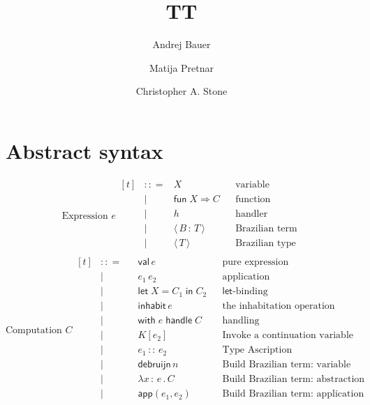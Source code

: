 \documentclass{article}
\newcommand{\bnf}{\mathrel{{:}{:}{=}}}
\newcommand{\bnfor}{|}
\newcommand{\x}{x}     %
\newcommand{\C}{C}     %
\newcommand{\K}{K}     %
\newcommand{\X}{X}     %
\newcommand{\e}{e}     %
\newcommand{\rgn}{r}   %
\newcommand{\T}{T}     %
\newcommand{\B}{B}     %
\newcommand{\val}{\mathsf{val}\,} %
\newcommand{\letin}[1]{\mathsf{let}\; #1 \;\mathsf{in}\;} %
\newcommand{\inhabitOp}[1]{\mathsf{inhabit}\,#1} %
\newcommand{\withhandle}[1]{\mathsf{with}\;#1\;\mathsf{handle}\;} %
\newcommand{\abs}[1]{\mathsf{abs}\;#1\;\mathsf{in}\;} %
\newcommand{\new}[2]{\mathsf{new}(#1,#2)} %
\newcommand{\fun}[1]{\mathsf{fun}\;#1\Rightarrow} %
\newcommand{\app}[2]{#1\,#2} %
\newcommand{\lam}[2]{\lambda #1 \,{:}\, #2 \,.\,} %
\newcommand{\kapp}[2]{#1[#2]} %
\newcommand{\bterm}[2]{\langle\,#1\, :\, #2\,\rangle} %
\newcommand{\bty}[1]{\langle\,#1\,\rangle} %
\newcommand{\makeApp}[2]{\mathsf{app}(#1,#2)} %
\newcommand{\debruijn}[1]{\mathsf{debruijn}\,#1} %
\newcommand{\ascribe}[2]{#1 \,{:}{:}\, #2} %
\begin{document}
\title{TT}
\author{Andrej Bauer \and Matija Pretnar \and Christopher A. Stone}
\maketitle

\section{Abstract syntax}
\label{sec:abstract-syntax}

\begin{equation*}
  \text{Expression $\e$}
  \begin{aligned}[t]
    &\bnf   {} & \X          && \text{variable} \\
    &\bnfor {} & \fun{\X} \C  && \text{function} \\
    &\bnfor {} & h           && \text{handler} \\
    &\bnfor {} & \bterm{\B}{\T}           && \text{Brazilian term} \\
    &\bnfor {} & \bty{\T}           && \text{Brazilian type} \\
  \end{aligned}
\end{equation*}
%
\begin{equation*}
  \text{Computation $\C$}
  \begin{aligned}[t]
    &\bnf   {} && \val \e                && \text{pure expression} \\
    &\bnfor {} && \app{\e_1}{\e_2}   && \text{application} \\
    &\bnfor {} && \letin{\X = \C_1} \C_2  && \text{$\mathsf{let}$-binding} \\
    &\bnfor {} && \inhabitOp{\e} && \text{the inhabitation operation} \\
    &\bnfor {} && \withhandle{\e} \C && \text{handling} \\
    &\bnfor {} && \kapp{\K}{\e_2}   && \text{Invoke a continuation variable} \\
    &\bnfor {} && \ascribe{\e_1}{\e_2} && \text{Type Ascription} \\
    &\bnfor {} && \debruijn{n} && \text{Build Brazilian term: variable} \\
    &\bnfor {} && \lam{\x}{\e} \C   && \text{Build Brazilian term: abstraction} \\
    &\bnfor {} && \makeApp{\e_1}{\e_2} && \text{Build Brazilian term: application} \\
  \end{aligned}
\end{equation*}
\end{document}
